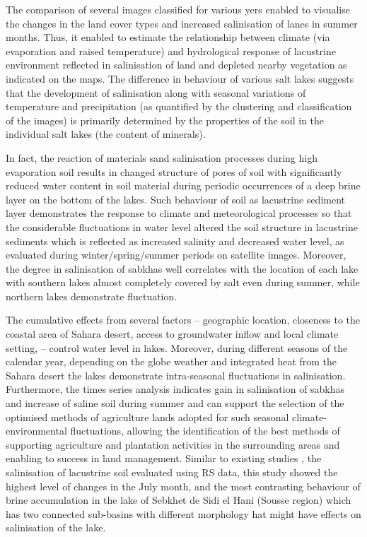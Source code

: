 \documentclass[environments,article,submit,pdftex,moreauthors]{Definitions/mdpi}
\begin{document}
The comparison of several images classified for various yers enabled to visualise the changes in the land cover types and increased salinisation of lanes in summer months. Thus, it enabled to estimate the relationship between climate (via evaporation and raised temperature) and hydrological response of lacustrine environment reflected in salinisation of land and depleted nearby vegetation as indicated on the maps. The difference in behaviour of various salt lakes suggests that the development of salinisation along with seasonal variations of temperature and precipitation (as quantified by the clustering and classification of the images) is primarily determined by the properties of the soil in the individual salt lakes (the content of minerals). 

In fact, the reaction of materials sand salinisation processes during high evaporation soil results in changed structure of pores of soil with significantly reduced water content in soil material during periodic occurrences of a deep brine layer on the bottom of the lakes. Such behaviour of soil as lacustrine sediment layer demonstrates the response to climate and meteorological processes so that the considerable fluctuations in water level altered the soil structure in lacustrine sediments which is reflected as increased salinity and decreased water level, as evaluated during winter/spring/summer periods on satellite images. Moreover, the degree in salinisation of sabkhas well correlates with the location of each lake with southern lakes almost completely covered by salt even during summer, while northern lakes demonstrate fluctuation. 

The cumulative effects from several factors -- geographic location, closeness to the coastal area of Sahara desert, access to groundwater inflow and local climate setting, -- control water level in lakes. Moreover, during different seasons of the calendar year, depending on the globe weather and integrated heat from the Sahara desert the lakes demonstrate intra-seasonal fluctuations in salinisation. Furthermore, the times series analysis indicates gain in salinisation of sabkhas and increase of saline soil during summer and can support the selection of the optimised methods of agriculture lands adopted for such seasonal climate-environmental fluctuations, allowing the identification of the best methods of supporting agriculture and plantation activities in the surrounding areas and enabling to success in land management. Similar to existing studies \cite{BAYATI2021126032,SHENG2016129,SCHRODER20221710}, the salinisation of lacustrine soil evaluated using RS data, this study showed the highest level of changes in the July month, and the most contrasting behaviour of brine accumulation in the lake of Sebkhet de Sidi el Hani (Sousse region) which has two connected sub-basins with different morphology hat might have effects on salinisation of the lake. 
\end{document}
